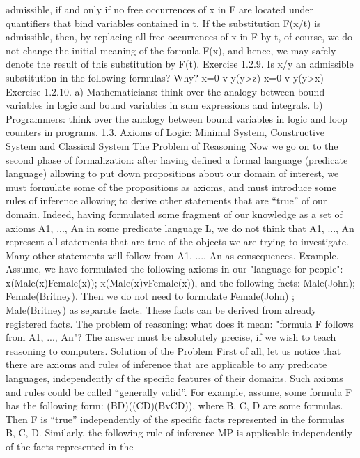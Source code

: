 admissible, if and only if no free occurrences of x in F are located under quantifiers that bind variables
contained in t. If the substitution F(x/t) is admissible, then, by replacing all free occurrences of x in F by t,
of course, we do not change the initial meaning of the formula F(x), and hence, we may safely denote the
result of this substitution by F(t).
Exercise 1.2.9. Is x/y an admissible substitution in the following formulas? Why?
x=0 v \exists y(y>z)
x=0 v \exists y(y>x)
Exercise 1.2.10. a) Mathematicians: think over the analogy between bound variables in logic and bound
variables in sum expressions and integrals.
b) Programmers: think over the analogy between bound variables in logic and loop counters in programs.
1.3. Axioms of Logic: Minimal System, Constructive System and Classical System
The Problem of Reasoning
Now we go on to the second phase of formalization: after having defined a formal language (predicate
language) allowing to put down propositions about our domain of interest, we must formulate some of the
propositions as axioms, and must introduce some rules of inference allowing to derive other statements
that are ``true'' of our domain.
Indeed, having formulated some fragment of our knowledge as a set of axioms A1, ..., An in some
predicate language L, we do not think that A1, ..., An represent all statements that are true of the objects
we are trying to investigate. Many other statements will follow from A1, ..., An as consequences.
Example. Assume, we have formulated the following axioms in our "language for people":
\forall x\neg (Male(x)\AND Female(x)); \forall x(Male(x)vFemale(x)), and the following facts: Male(John);
Female(Britney). Then we do not need to formulate \neg Female(John) ; \neg Male(Britney) as separate facts.
These facts can be derived from already registered facts.
The problem of reasoning: what does it mean: "formula F follows from A1, ..., An"? The answer must be
absolutely precise, if we wish to teach reasoning to computers.
Solution of the Problem
First of all, let us notice that there are axioms and rules of inference that are applicable to any predicate
languages, independently of the specific features of their domains. Such axioms and rules could be called
``generally valid''.
For example, assume, some formula F has the following form:
(B\IMPLIES D)\IMPLIES ((C\IMPLIES D)\IMPLIES (BvC\IMPLIES D)),
where B, C, D are some formulas. Then F is ``true'' independently of the specific facts represented in the
formulas B, C, D.
Similarly, the following rule of inference MP is applicable independently of the facts represented in the

